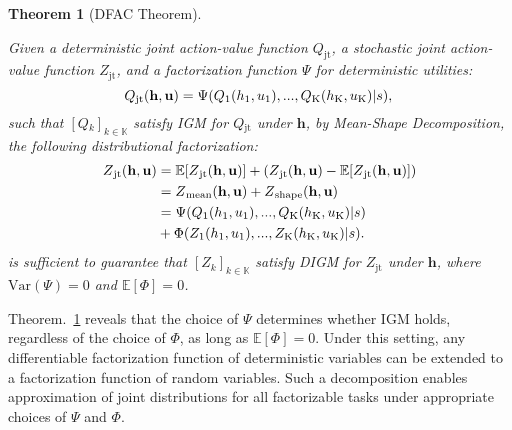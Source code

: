 \documentclass{article}
\newcommand{\state}{s}
\newcommand{\jointaction}{\mathbf{u}}
\newcommand{\action}{u}
\newcommand{\jointobservationhistory}{\mathbf{h}}
\newcommand{\observationhistory}{h}
\newcommand{\agentspace}{\mathbb{K}}
\newcommand{\agentcounter}{k}
\newcommand{\numberofagents}{\mathrm{K}}
\newcommand{\utilityexp}{Q}
\newcommand{\utility}{Z}
\newcommand{\joint}{\mathrm{jt}}
\newcommand{\meandecompositionfunction}{\Psi}
\newcommand{\shapedecompositionfunction}{\Phi}
\newcommand{\digm}{\textit{DIGM}}
\newtheorem{theorem}{Theorem}[section]
\begin{document}
\begin{theorem}[DFAC Theorem]
\label{thm:dfac}

Given a deterministic joint action-value function $\utilityexp_{\joint}$, a stochastic joint action-value function $\utility_{\joint}$, and a factorization function $\meandecompositionfunction$ for deterministic utilities:
\begin{equation}
\utilityexp{}_{\joint{}}(\jointobservationhistory{},{\jointaction{}})=\meandecompositionfunction(\utilityexp{}_1(\observationhistory{}_1,\action{}_1), ..., \utilityexp{}_{\numberofagents{}}(\observationhistory{}_{\numberofagents{}},\action{}_{\numberofagents{}})\vert\state),
\notag{}
\end{equation}
such that $[\utilityexp{}_\agentcounter{}]_{\agentcounter{}\in\agentspace{}}$ satisfy IGM for $\utilityexp{}_{\joint{}}$ under $\jointobservationhistory{}$, by Mean-Shape Decomposition, the following distributional factorization:
\begin{equation}
\begin{split}
\utility{}_{\joint{}}(\jointobservationhistory{},{\jointaction{}}) &= \mathbb{E}[\utility{}_{\joint{}}(\jointobservationhistory{},{\jointaction{}})]+(\utility{}_{\joint{}}(\jointobservationhistory{},{\jointaction{}})-\mathbb{E}[\utility{}_{\joint{}}(\jointobservationhistory{},{\jointaction{}})]) \\
&= \utility{}_{\mathrm{mean}}(\jointobservationhistory{},{\jointaction{}})+\utility{}_{\mathrm{shape}}(\jointobservationhistory{},{\jointaction{}})\\
&= \meandecompositionfunction{}(\utilityexp_1(\observationhistory{}_1,\action{}_1),...,\utilityexp_{\numberofagents{}}(\observationhistory{}_{\numberofagents{}},\action{}_{\numberofagents{}})\vert\state)\\
&+ \shapedecompositionfunction{}(\utility_1(\observationhistory{}_1,\action{}_1),...,\utility_{\numberofagents{}}(\observationhistory{}_{\numberofagents{}},\action{}_{\numberofagents{}})\vert\state).
\end{split}
\notag{}
\end{equation}
is sufficient to guarantee that $[\utility{}_\agentcounter{}]_{\agentcounter{}\in\agentspace{}}$ satisfy \digm{} for $\utility{}_{\joint{}}$ under $\jointobservationhistory{}$, where $\mathrm{Var}(\meandecompositionfunction)=0$ and  $\mathbb{E}[\shapedecompositionfunction]=0$.
\end{theorem} 
Theorem.~\ref{thm:dfac} reveals that the choice of $\meandecompositionfunction$ determines whether IGM holds, regardless of the choice of $\shapedecompositionfunction$, as long as $\mathbb{E}[\shapedecompositionfunction]=0$. Under this setting, any differentiable factorization function of deterministic variables can be extended to a factorization function of random variables. Such a decomposition enables approximation of joint distributions for all factorizable tasks under appropriate choices of  $\meandecompositionfunction{}$ and $\shapedecompositionfunction{}$.
\end{document}
